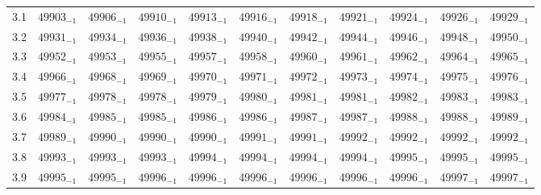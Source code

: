 \documentclass[10pt, a4paper]{article}
\begin{document}
\begin{center}
\begin{longtable}{c || c c c c c | c c c c c}
        3.1 & \({49903}_{-1}\) & \({49906}_{-1}\) & \({49910}_{-1}\) & \({49913}_{-1}\) & \({49916}_{-1}\) & \({49918}_{-1}\) & \({49921}_{-1}\) & \({49924}_{-1}\) & \({49926}_{-1}\) & \({49929}_{-1}\)\\
        3.2 & \({49931}_{-1}\) & \({49934}_{-1}\) & \({49936}_{-1}\) & \({49938}_{-1}\) & \({49940}_{-1}\) & \({49942}_{-1}\) & \({49944}_{-1}\) & \({49946}_{-1}\) & \({49948}_{-1}\) & \({49950}_{-1}\)\\
        3.3 & \({49952}_{-1}\) & \({49953}_{-1}\) & \({49955}_{-1}\) & \({49957}_{-1}\) & \({49958}_{-1}\) & \({49960}_{-1}\) & \({49961}_{-1}\) & \({49962}_{-1}\) & \({49964}_{-1}\) & \({49965}_{-1}\)\\
        3.4 & \({49966}_{-1}\) & \({49968}_{-1}\) & \({49969}_{-1}\) & \({49970}_{-1}\) & \({49971}_{-1}\) & \({49972}_{-1}\) & \({49973}_{-1}\) & \({49974}_{-1}\) & \({49975}_{-1}\) & \({49976}_{-1}\)\\
        3.5 & \({49977}_{-1}\) & \({49978}_{-1}\) & \({49978}_{-1}\) & \({49979}_{-1}\) & \({49980}_{-1}\) & \({49981}_{-1}\) & \({49981}_{-1}\) & \({49982}_{-1}\) & \({49983}_{-1}\) & \({49983}_{-1}\)\\
        3.6 & \({49984}_{-1}\) & \({49985}_{-1}\) & \({49985}_{-1}\) & \({49986}_{-1}\) & \({49986}_{-1}\) & \({49987}_{-1}\) & \({49987}_{-1}\) & \({49988}_{-1}\) & \({49988}_{-1}\) & \({49989}_{-1}\)\\
        3.7 & \({49989}_{-1}\) & \({49990}_{-1}\) & \({49990}_{-1}\) & \({49990}_{-1}\) & \({49991}_{-1}\) & \({49991}_{-1}\) & \({49992}_{-1}\) & \({49992}_{-1}\) & \({49992}_{-1}\) & \({49992}_{-1}\)\\
        3.8 & \({49993}_{-1}\) & \({49993}_{-1}\) & \({49993}_{-1}\) & \({49994}_{-1}\) & \({49994}_{-1}\) & \({49994}_{-1}\) & \({49994}_{-1}\) & \({49995}_{-1}\) & \({49995}_{-1}\) & \({49995}_{-1}\)\\
        3.9 & \({49995}_{-1}\) & \({49995}_{-1}\) & \({49996}_{-1}\) & \({49996}_{-1}\) & \({49996}_{-1}\) & \({49996}_{-1}\) & \({49996}_{-1}\) & \({49996}_{-1}\) & \({49997}_{-1}\) & \({49997}_{-1}\)\\
        \hline
    \end{longtable}
    
\end{center}
\pagebreak
\end{document}
